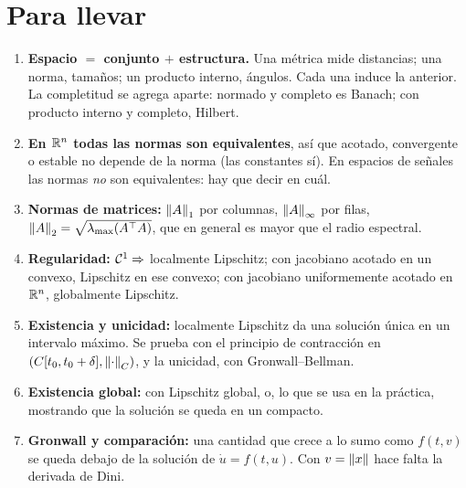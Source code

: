\section{Para llevar}
\label{sec:pm-cierre}

\begin{parallevar}
\begin{enumerate}
  \item \textbf{Espacio $=$ conjunto $+$ estructura.} Una métrica mide distancias; una norma, tamaños; un producto interno, ángulos. Cada una induce la anterior. La completitud se agrega aparte: normado y completo es Banach; con producto interno y completo, Hilbert.
  \item \textbf{En $\mathbb{R}^n$ todas las normas son equivalentes}, así que acotado, convergente o estable no depende de la norma (las constantes sí). En espacios de señales las normas \emph{no} son equivalentes: hay que decir en cuál.
  \item \textbf{Normas de matrices:} $\left\lVert A\right\rVert_1$ por columnas, $\left\lVert A\right\rVert_\infty$ por filas, $\left\lVert A\right\rVert_2=\sqrt{\lambda_{\max}(A^{\top} A)}$, que en general es mayor que el radio espectral.
  \item \textbf{Regularidad:} $\mathcal{C}^{1}\Rightarrow$ localmente Lipschitz; con jacobiano acotado en un convexo, Lipschitz en ese convexo; con jacobiano uniformemente acotado en $\mathbb{R}^n$, globalmente Lipschitz.
  \item \textbf{Existencia y unicidad:} localmente Lipschitz da una solución única en un intervalo máximo. Se prueba con el principio de contracción en $(C[t_0,t_0+\delta],\left\lVert \cdot\right\rVert_C)$, y la unicidad, con Gronwall--Bellman.
  \item \textbf{Existencia global:} con Lipschitz global, o, lo que se usa en la práctica, mostrando que la solución se queda en un compacto.
  \item \textbf{Gronwall y comparación:} una cantidad que crece a lo sumo como $f(t,v)$ se queda debajo de la solución de $\dot u=f(t,u)$. Con $v=\left\lVert x\right\rVert$ hace falta la derivada de Dini.
\end{enumerate}
\end{parallevar}

